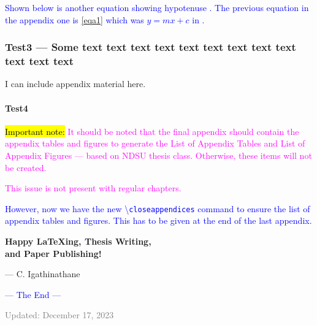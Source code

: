 \documentclass[phd]{ndsu-thesis-2022}
\newcommand\italk[1]{\textcolor{blue}{#1}}  %
\newcommand\cmd[1]{\textbackslash\texttt{#1}}  %
\begin{document}
\italk{Shown below is another equation showing hypotenuse \Cref{eqc1}. The previous equation in the appendix one is \cref{eqa1} which was $y = mx + c$ in \cpageref{eqa1}. } 
 

\subsubsection{Test3 --- Some text text text text text text text text text text text text}
I can include appendix material here. 

\paragraph{Test4}

{\hl{Important note:}
\textcolor{magenta}{It should be noted that the final appendix should contain the appendix tables and figures to generate the List of Appendix Tables and List of Appendix Figures --- based on NDSU thesis class. Otherwise, these items will not be created.}
} 

\textcolor{magenta}{This issue is not present with regular chapters.}

\italk{However, now we have the new \cmd{closeappendices} command to ensure the list of appendix tables and figures. This has to be given at the end of the last appendix.}

\vspace{1cm}
\begin{center}
{\LARGE\bfseries
Happy {\LaTeX}ing, Thesis Writing, \\
and Paper Publishing!
}
\end{center}

\hfill {\footnotesize --- C. Igathinathane}

\vspace{0.1in}
\begin{center}
\italk{--- The End ---}
\end{center}

\vfill
{\noindent\scriptsize\textcolor{gray}{Updated: December 17, 2023}}

\closeappendices  %
\end{document}
